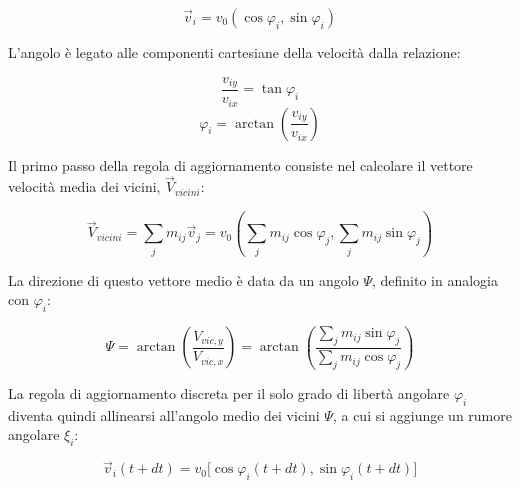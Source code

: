 \begin{equation} \label{eq:ch27_19}
\vec{v}_i = v_0 (\cos\varphi_i, \sin\varphi_i)
\end{equation}

L'angolo è legato alle componenti cartesiane della velocità dalla relazione:

\begin{equation} \label{eq:ch27_20}
\frac{v_{iy}}{v_{ix}} = \tan\varphi_i
\end{equation}
\begin{equation} \label{eq:ch27_21}
\varphi_i = \arctan\left(\frac{v_{iy}}{v_{ix}}\right)
\end{equation}

Il primo passo della regola di aggiornamento consiste nel calcolare il vettore velocità media dei vicini, $\vec{V}_{vicini}$:

\begin{equation} \label{eq:ch27_22}
\vec{V}_{vicini} = \sum_j m_{ij}\vec{v}_j = v_0 \left(\sum_j m_{ij} \cos\varphi_j, \sum_j m_{ij} \sin\varphi_j\right)
\end{equation}

La direzione di questo vettore medio è data da un angolo $\Psi$, definito in analogia con $\varphi_i$:

\begin{equation} \label{eq:ch27_23}
\Psi = \arctan\left(\frac{V_{vic,y}}{V_{vic,x}}\right) = \arctan\left(\frac{\sum_j m_{ij} \sin\varphi_j}{\sum_j m_{ij} \cos\varphi_j}\right)
\end{equation}

La regola di aggiornamento discreta per il solo grado di libertà angolare $\varphi_i$ diventa quindi allinearsi all'angolo medio dei vicini $\Psi$, a cui si aggiunge un rumore angolare $\xi_i$:

\vspace{0.5cm}
\noindent{}
\vspace{0.5cm}

\begin{equation} \label{eq:ch27_25}
\vec{v}_{i}(t+dt) = v_0 \bigg[\cos\varphi_i(t+dt), \sin\varphi_i(t+dt)\bigg]
\end{equation}

